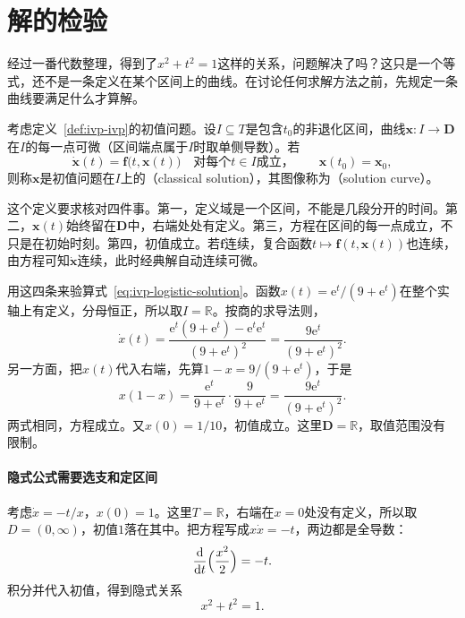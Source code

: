 \section{解的检验}
\label{sec:ivp-verification}

经过一番代数整理，得到了$x^2+t^2=1$这样的关系，问题解决了吗？这只是一个等式，还不是一条定义在某个区间上的曲线。在讨论任何求解方法之前，先规定一条曲线要满足什么才算解。

\begin{definition}[经典解]
 \label{def:ivp-classical-solution}
 考虑定义~\ref{def:ivp-ivp}的初值问题。设$I\subseteq T$是包含$t_0$的非退化区间，曲线$\bm{x}:I\to\bm{D}$在$I$的每一点可微（区间端点属于$I$时取单侧导数）。若
 \begin{equation}
 \dot{\bm{x}}(t)=\bm{f}\bigl(t,\bm{x}(t)\bigr)\quad\text{对每个}t\in I\text{成立，}\qquad
 \bm{x}(t_0)=\bm{x}_0,
 \label{eq:ivp-classical-solution}
 \end{equation}
 则称$\bm{x}$是初值问题在$I$上的（classical solution），其图像称为（solution curve）。
\end{definition}

这个定义要求核对四件事。第一，定义域是一个区间，不能是几段分开的时间。第二，$\bm{x}(t)$始终留在$\bm{D}$中，右端处处有定义。第三，方程在区间的每一点成立，不只是在初始时刻。第四，初值成立。若$\bm{f}$连续，复合函数$t\mapsto\bm{f}(t,\bm{x}(t))$也连续，由方程可知$\dot{\bm{x}}$连续，此时经典解自动连续可微。

用这四条来验算式~\eqref{eq:ivp-logistic-solution}。函数$x(t)=\mathrm{e}^{t}/(9+\mathrm{e}^{t})$在整个实轴上有定义，分母恒正，所以取$I=\mathbb{R}$。按商的求导法则，
\[
 \dot{x}(t)=\frac{\mathrm{e}^{t}(9+\mathrm{e}^{t})-\mathrm{e}^{t}\mathrm{e}^{t}}{(9+\mathrm{e}^{t})^2}
 =\frac{9\mathrm{e}^{t}}{(9+\mathrm{e}^{t})^2}.
\]
另一方面，把$x(t)$代入右端，先算$1-x=9/(9+\mathrm{e}^{t})$，于是
\[
 x(1-x)=\frac{\mathrm{e}^{t}}{9+\mathrm{e}^{t}}\cdot\frac{9}{9+\mathrm{e}^{t}}
 =\frac{9\mathrm{e}^{t}}{(9+\mathrm{e}^{t})^2}.
\]
两式相同，方程成立。又$x(0)=1/10$，初值成立。这里$\bm{D}=\mathbb{R}$，取值范围没有限制。

\paragraph{隐式公式需要选支和定区间}
考虑$\dot{x}=-t/x$，$x(0)=1$。这里$T=\mathbb{R}$，右端在$x=0$处没有定义，所以取$D=(0,\infty)$，初值$1$落在其中。把方程写成$x\dot{x}=-t$，两边都是全导数：
\[
 \frac{\mathrm{d}}{\mathrm{d}t}\Bigl(\frac{x^2}{2}\Bigr)=-t.
\]
积分并代入初值，得到隐式关系
\begin{equation}
 x^2+t^2=1.
 \label{eq:ivp-implicit-circle}
\end{equation}

